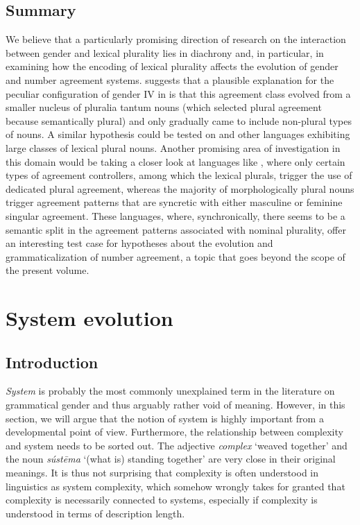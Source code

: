 \documentclass[output=collectionpaper]{langsci/langscibook}
\begin{document}
  \subsection{Summary}
We believe that a particularly promising direction of research on the interaction between gender and lexical plurality lies in diachrony and, in particular, in examining how the encoding of lexical plurality affects the evolution of gender and number agreement systems.  suggests that a plausible explanation for the peculiar configuration of gender IV in  is that this agreement class evolved from a smaller nucleus of pluralia tantum nouns (which selected plural agreement because semantically plural) and only gradually came to include non-plural types of nouns. A similar hypothesis could be tested on  and other  languages exhibiting large classes of lexical plural nouns. Another promising area of investigation in this domain would be taking a closer look at languages like , where only certain types of agreement controllers, among which the lexical plurals, trigger the use of dedicated plural agreement, whereas the majority of morphologically plural nouns trigger agreement patterns that are syncretic with either masculine or feminine singular agreement. These languages, where, synchronically, there seems to be a semantic split in the agreement patterns associated with nominal plurality, offer an interesting test case for hypotheses about the evolution and grammaticalization of number agreement, a topic that goes beyond the scope of the present volume.


\section{System evolution}
\label{sec:WDG:10}

  \subsection{Introduction}

\textit{System} is probably the most commonly unexplained term in the literature on grammatical gender and thus arguably rather void of meaning. However, in this section, we will argue that the notion of system is highly important from a developmental point of view. Furthermore, the relationship between complexity and system needs to be sorted out. The  adjective \textit{complex} `weaved together' and the  noun \textit{sústēma} `(what is) standing together' are very close in their original meanings. It is thus not surprising that complexity is often understood in linguistics as system complexity, which somehow wrongly takes for granted that complexity is necessarily connected to systems, especially if complexity is understood in terms of description length.
\end{document}
